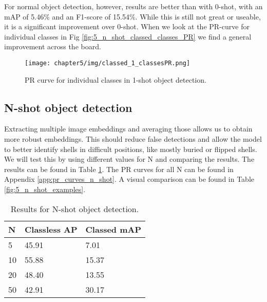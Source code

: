 For normal object detection, however, results are better than with 0-shot, with an mAP of 5.46\% and an F1-score of 15.54\%. While this is still not great or useable, it is a significant improvement over 0-shot. When we look at the PR-curve for individual classes in Fig \ref{fig:5_n_shot_classed_classes_PR} we find a general improvement across the board.

\begin{figure}[H]
    \centering
    \texttt{[image: chapter5/img/classed\_1\_classesPR.png]}
    \caption{PR curve for individual classes in 1-shot object detection.}
    \label{fig:5_1_shot_classed_classes_PR}
\end{figure}

\subsection*{N-shot object detection}
Extracting multiple image embeddings and averaging those allows us to obtain more robust embeddings. This should reduce false detections and allow the model to better identify shells in difficult positions, like mostly buried or flipped shells. We will test this by using different values for N and comparing the results. The results can be found in Table \ref{tab:5_n_shot_results}. The PR curves for all N can be found in Appendix \ref{app:pr_curves_n_shot}. A visual comparison can be found in Table \ref{fig:5_n_shot_examples}.

\begin{table}[H]
    \centering
    \captionsetup{justification=centering}
    \begin{tabular}{|l|l|l|}
        \hline
        N & Classless AP & Classed mAP \\ \hline
        5 & 45.91 & 7.01 \\ \hline
        10 & 55.88 & 15.37 \\ \hline
        20 & 48.40 & 13.55 \\ \hline
        50 & 42.91 & 30.17 \\ \hline
    \end{tabular}
    \caption{Results for N-shot object detection.}
    \label{tab:5_n_shot_results}
\end{table}


